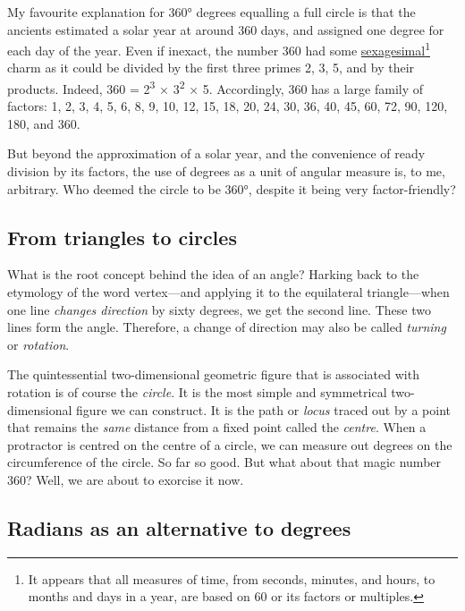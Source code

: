 \documentclass[
  a4paper,
]{article}
\begin{document}
My favourite explanation for 360° degrees equalling a full circle is
that the ancients estimated a solar year at around 360 days, and
assigned one degree for each day of the year. Even if inexact, the
number 360 had some
\href{https://en.wikipedia.org/wiki/Sexagesimal}{sexagesimal}\footnote{It
  appears that all measures of time, from seconds, minutes, and hours,
  to months and days in a year, are based on 60 or its factors or
  multiples.} charm as it could be divided by the first three primes 2,
3, 5, and by their products. Indeed, 360 = 2\textsuperscript{3} ×
3\textsuperscript{2} × 5. Accordingly, 360 has a large family of
factors: 1, 2, 3, 4, 5, 6, 8, 9, 10, 12, 15, 18, 20, 24, 30, 36, 40, 45,
60, 72, 90, 120, 180, and 360.

But beyond the approximation of a solar year, and the convenience of
ready division by its factors, the use of degrees as a unit of angular
measure is, to me, arbitrary. Who deemed the circle to be 360°, despite
it being very factor-friendly?

\hypertarget{from-triangles-to-circles}{%
\subsection{From triangles to circles}\label{from-triangles-to-circles}}

What is the root concept behind the idea of an angle? Harking back to
the etymology of the word vertex---and applying it to the equilateral
triangle---when one line \emph{changes direction} by sixty degrees, we
get the second line. These two lines form the angle. Therefore, a change
of direction may also be called \emph{turning} or \emph{rotation}.

The quintessential two-dimensional geometric figure that is associated
with rotation is of course the \emph{circle}. It is the most simple and
symmetrical two-dimensional figure we can construct. It is the path or
\emph{locus} traced out by a point that remains the \emph{same} distance
from a fixed point called the \emph{centre}. When a protractor is
centred on the centre of a circle, we can measure out degrees on the
circumference of the circle. So far so good. But what about that magic
number 360? Well, we are about to exorcise it now. 
\normalfont

\hypertarget{radians-as-an-alternative-to-degrees}{%
\subsection{Radians as an alternative to
degrees}\label{radians-as-an-alternative-to-degrees}}
\end{document}
